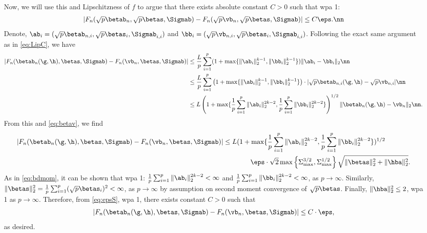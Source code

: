 Now, we will use this and Lipschitzness of $f$ to argue that there exists absolute constant $C>0$ such that wpa 1:
\begin{align}
|F_n(\sqrt{p}\betab_n,\sqrt{p}\betas,\Sigmab) - F_n(\sqrt{p}\vb_n,\sqrt{p}\betas,\Sigmab) | \leq C\eps.\nn
\end{align}
Denote, $\ab_i=(\sqrt{p}\betab_{n,i},\sqrt{p}\betas_i,\Sigmab_{i,i})$ and $\bb_i=(\sqrt{p}\vb_{n,i},\sqrt{p}\betas_i,\Sigmab_{i,i})$. Following the exact same argument as in \eqref{eq:LipC}, we have
\begin{align}
|F_n(\betab_n(\g,\h),\betas,\Sigmab) - F_n(\vb_n,\betas,\Sigmab)| &\leq \frac{L}{p}\sum_{i=1}^p (1+\max\{\|\ab_i\|_2^{k-1},\|\bb_i\|_2^{k-1}\})\|\ab_i-\bb_i\|_2\nn \\
&\leq \frac{L}{p}\sum_{i=1}^p \left(1+\max\{\|\ab_i\|_2^{k-1},\|\bb_i\|_2^{k-1}\}\right)\cdot|\sqrt{p}\betab_{n,i}(\g,\h) - \sqrt{p}\vb_{n,i}|\nn\\
&\leq L\left(1+\max\{\frac{1}{p}\sum_{i=1}^p \|\ab_i\|_2^{2k-2},\frac{1}{p}\sum_{i=1}^p\|\bb_i\|_2^{2k-2}\} \right)^{1/2}{\|\betab_{n}(\g,\h) - \vb_n\|_2}\nn.
\end{align}
From this and \eqref{eq:betav}, we find
\begin{align}
|F_n(\betab_n(\g,\h),\betas,\Sigmab) - F_n(\vb_n,\betas,\Sigmab)| &\leq 
L(1+\max\{\frac{1}{p}\sum_{i=1}^p \|\ab_i\|_2^{2k-2},\frac{1}{p}\sum_{i=1}^p\|\bb_i\|_2^{2k-2}\} )^{1/2} 
\\
&\qquad\qquad\eps\cdot\sqrt{2}\max\left\{\Sigma_{\max}^{3/2},\Sigma_{\max}^{1/2}\right\}\sqrt{\|\betas\|_2^2 + \|\hba\|_2^2}.\label{eq:epsS}
\end{align}
As in \eqref{eq:bdmom}, it can be shown that wpa 1: $\frac{1}{p}\sum_{i=1}^p \|\ab_i\|_2^{2k-2}<\infty$ and $\frac{1}{p}\sum_{i=1}^p \|\bb_i\|_2^{2k-2}<\infty$, as $p\rightarrow\infty$. Similarly, $\|\betas\|_2^2 = \frac{1}{p}\sum_{i=1}^p(\sqrt{p}\betas_i)^2<\infty$, as $p\rightarrow \infty$ {\color{red} by assumption on second moment convergence of $\sqrt{p}\betas$.} Finally, $\|\hba\|_2^2\leq 2$, wpa 1 as $p\rightarrow\infty$. Therefore, from \eqref{eq:epsS}, wpa 1, there exists constant $C>0$ such that 
\begin{align}
|F_n(\betab_n(\g,\h),\betas,\Sigmab) - F_n(\vb_n,\betas,\Sigmab)| \leq C \cdot\eps,
\end{align}
as desired.


